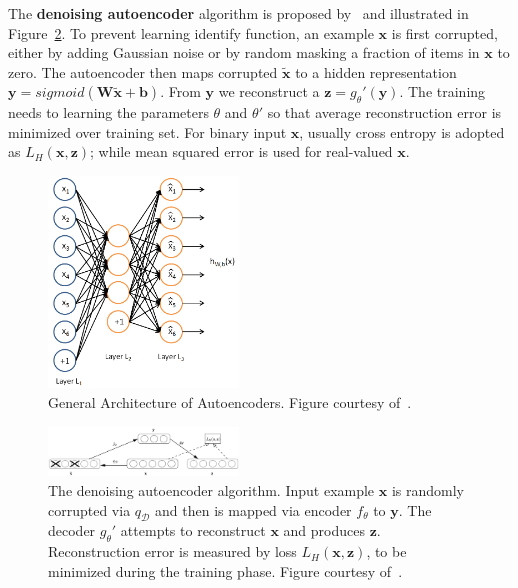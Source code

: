 The \textbf{denoising autoencoder} algorithm is proposed by~\cite{DenoiseAE} and illustrated in
Figure~\ref{Fig:dAEAlgorithm}.
To prevent learning identify function, an example $\mathbf{x}$ is first corrupted, either by
adding Gaussian noise or by random masking a fraction of items in $\mathbf{x}$ to zero.
The autoencoder then maps corrupted $\mathbf{\tilde{x}}$ to a hidden representation $\mathbf{y} = sigmoid(\mathbf{W}\tilde{\mathbf{x}} + \mathbf{b})$.
From $\mathbf{y}$ we reconstruct a $\mathbf{z}=g_\theta'(\mathbf{y})$.
The training needs to learning the parameters $\theta$ and $\theta'$ so that average reconstruction error is minimized over training set.
For binary input $\mathbf{x}$, usually cross entropy is adopted as $L_H(\mathbf{x}, \mathbf{z})$;
while mean squared error is used for real-valued $\mathbf{x}$.

\begin{figure}[h]
\centering
\includegraphics[width=0.45\textwidth]{figures/autoencoder.png}
\caption{General Architecture of Autoencoders.
        Figure courtesy of~\cite{UFLDLAutoencoder}.}
\label{Fig:AEArchitecture}
\end{figure}

\begin{figure}[h]
\centering
\includegraphics[width=0.45\textwidth]{figures/denoiseautoencoder.png}
        \caption{The denoising autoencoder algorithm.
        Input example $\mathbf{x}$ is randomly corrupted via $q_\mathcal{D}$ and then
        is mapped via encoder $f_\theta$ to $\mathbf{y}$.
        The decoder $g_\theta'$ attempts to reconstruct $\mathbf{x}$ and produces $\mathbf{z}$.
        Reconstruction error is measured by loss $L_H(\mathbf{x}, \mathbf{z})$, to be minimized
        during the training phase.
        Figure courtesy of~\cite{DenoiseAE}.}
\label{Fig:dAEAlgorithm}
\end{figure}

